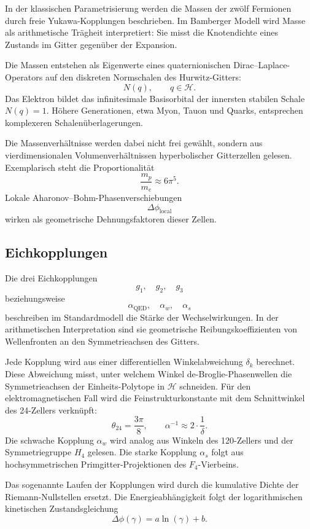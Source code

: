 \documentclass[11pt,a4paper]{article}
\begin{document}
In der klassischen Parametrisierung werden die Massen der zwölf Fermionen durch freie
Yukawa-Kopplungen beschrieben. Im Bamberger Modell wird Masse als arithmetische Trägheit
interpretiert: Sie misst die Knotendichte eines Zustands im Gitter gegenüber der Expansion.

Die Massen entstehen als Eigenwerte eines quaternionischen Dirac--Laplace-Operators auf den
diskreten Normschalen des Hurwitz-Gitters:
\[
  N(q), \qquad q\in\mathcal{H}.
\]
Das Elektron bildet das infinitesimale Basisorbital der innersten stabilen Schale
$N(q)=1$. Höhere Generationen, etwa Myon, Tauon und Quarks, entsprechen komplexeren
Schalenüberlagerungen.

Die Massenverhältnisse werden dabei nicht frei gewählt, sondern aus vierdimensionalen
Volumenverhältnissen hyperbolischer Gitterzellen gelesen. Exemplarisch steht die
Proportionalität
\[
  \frac{m_p}{m_e} \approx 6\pi^5.
\]
Lokale Aharonov--Bohm-Phasenverschiebungen
\[
  \Delta\phi_{\mathrm{local}}
\]
wirken als geometrische Dehnungsfaktoren dieser Zellen.

\subsection{Eichkopplungen}

Die drei Eichkopplungen
\[
  g_1,\quad g_2,\quad g_3
\]
beziehungsweise
\[
  \alpha_{\mathrm{QED}},\quad \alpha_w,\quad \alpha_s
\]
beschreiben im Standardmodell die Stärke der Wechselwirkungen. In der arithmetischen
Interpretation sind sie geometrische Reibungskoeffizienten von Wellenfronten an den
Symmetrieachsen des Gitters.

Jede Kopplung wird aus einer differentiellen Winkelabweichung $\delta_k$ berechnet. Diese
Abweichung misst, unter welchem Winkel de-Broglie-Phasenwellen die Symmetrieachsen der
Einheits-Polytope in $\mathcal{H}$ schneiden. Für den elektromagnetischen Fall wird die
Feinstrukturkonstante mit dem Schnittwinkel des 24-Zellers verknüpft:
\[
  \theta_{24} = \frac{3\pi}{8},
  \qquad
  \alpha^{-1} \approx 2\cdot\frac{1}{\delta}.
\]
Die schwache Kopplung $\alpha_w$ wird analog aus Winkeln des 120-Zellers und der
Symmetriegruppe $H_4$ gelesen. Die starke Kopplung $\alpha_s$ folgt aus hochsymmetrischen
Primgitter-Projektionen des $F_4$-Vierbeins.

Das sogenannte Laufen der Kopplungen wird durch die kumulative Dichte der
Riemann-Nullstellen ersetzt. Die Energieabhängigkeit folgt der logarithmischen kinetischen
Zustandsgleichung
\[
  \Delta\phi(\gamma) = a\ln(\gamma)+b.
\]
\end{document}
